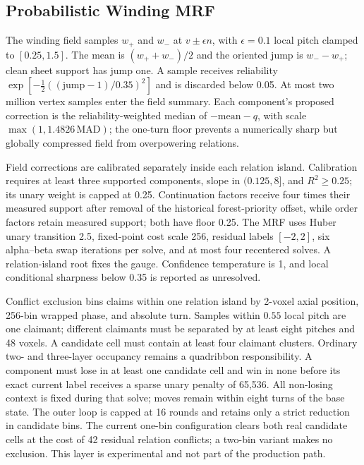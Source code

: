 \subsection{Probabilistic Winding MRF}
\label{app:prob-winding}

The winding field samples $w_+$ and $w_-$ at $v\pm\epsilon n$, with $\epsilon=0.1$ local pitch clamped to $[0.25,1.5]$. The mean is $(w_++w_-)/2$ and the oriented jump is $w_--w_+$; clean sheet support has jump one. A sample receives reliability $\exp[-\tfrac12((\mathrm{jump}-1)/0.35)^2]$ and is discarded below 0.05. At most two million vertex samples enter the field summary. Each component's proposed correction is the reliability-weighted median of $-\mathrm{mean}-q$, with scale $\max(1,1.4826\,\mathrm{MAD})$; the one-turn floor prevents a numerically sharp but globally compressed field from overpowering relations.

Field corrections are calibrated separately inside each relation island. Calibration requires at least three supported components, slope in $(0.125,8]$, and $R^2\ge0.25$; its unary weight is capped at 0.25. Continuation factors receive four times their measured support after removal of the historical forest-priority offset, while order factors retain measured support; both have floor 0.25. The MRF uses Huber unary transition 2.5, fixed-point cost scale 256, residual labels $[-2,2]$, six alpha--beta swap iterations per solve, and at most four recentered solves. A relation-island root fixes the gauge. Confidence temperature is 1, and local conditional sharpness below 0.35 is reported as unresolved.

Conflict exclusion bins claims within one relation island by 2-voxel axial position, 256-bin wrapped phase, and absolute turn. Samples within $0.55$ local pitch are one claimant; different claimants must be separated by at least eight pitches and 48 voxels. A candidate cell must contain at least four claimant clusters. Ordinary two- and three-layer occupancy remains a quadribbon responsibility. A component must lose in at least one candidate cell and win in none before its exact current label receives a sparse unary penalty of 65,536. All non-losing context is fixed during that solve; moves remain within eight turns of the base state. The outer loop is capped at 16 rounds and retains only a strict reduction in candidate bins. The current one-bin configuration clears both real candidate cells at the cost of 42 residual relation conflicts; a two-bin variant makes no exclusion. This layer is experimental and not part of the production path.

